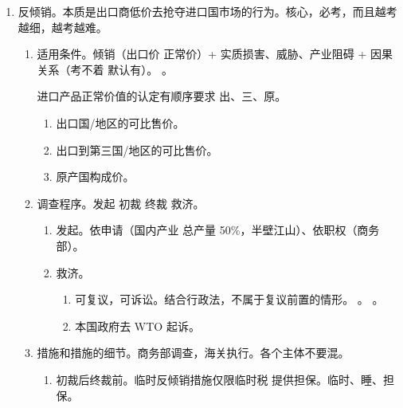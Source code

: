 \begin{enumerate}
\begin{enumerate}
          \item 保护原则。在“境外”处理数据，损害国家安全、公共利益、公民合法权益，依法追究法律责任。
          \item 数据安全审查制度。依申请 \hz 依职权双启动机制。
        \end{enumerate}
  \item 反倾销。本质是出口商低价去抢夺进口国市场的行为。核心，必考，而且越考越细，越考越难。
        \begin{enumerate}
          \item 适用条件。倾销（出口价 \xyh 正常价）+ 实质损害、威胁、产业阻碍 + 因果关系（考不着 \yjt 默认有）。
                。
                \begin{kk}{进口产品正常价值的认定有顺序要求}
                  出、三、原。
                  \begin{enumerate}
                    \item 出口国/地区的可比售价。
                    \item 出口到第三国/地区的可比售价。
                    \item 原产国构成价。
                  \end{enumerate}
                \end{kk}
          \item 调查程序。发起 \yjt 初裁 \yjt 终裁 \yjt 救济。
                \begin{enumerate}
                  \item 发起。依申请（国内产业 \dydy 总产量 50\%，半壁江山）、依职权（商务部）。
                  \item 救济。
                        \begin{enumerate}
                          \item 可复议，可诉讼。结合行政法，不属于复议前置的情形。
                                。
                                。
                          \item 本国政府去 WTO 起诉。
                        \end{enumerate}
                \end{enumerate}
          \item 措施和措施的细节。商务部调查，海关执行。各个主体不要混。
                \begin{enumerate}
                  \item 初裁后终裁前。临时反倾销措施仅限临时税 \hz 提供担保。临时、睡、担保。

\end{enumerate}
\end{enumerate}
\end{enumerate}
